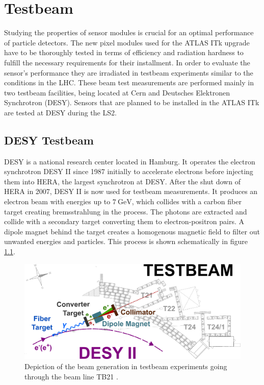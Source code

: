 \chapter{Testbeam}
Studying the properties of sensor modules is crucial for an optimal performance of particle detectors. The new pixel modules used for the ATLAS ITk upgrade have to be thoroughly
tested in terms of efficiency and radiation hardness to fulfill the necessary requirements for their installment.
In order to evaluate the sensor's performance they are irradiated in testbeam experiments similar to the conditions in the LHC.
These beam test measurements are performed mainly in two testbeam facilities, being located at Cern and Deutsches Elektronen Synchrotron (DESY). Sensors that are planned to be
installed in the ATLAS ITk are tested at DESY during the LS2.

\section{DESY Testbeam}
DESY is a national research center located in Hamburg. It operates the electron synchrotron DESY II since 1987 initially to accelerate electrons before injecting them into
HERA, the largest synchrotron at DESY. After the shut down of HERA in 2007, DESY II is now used for testbeam measurements. It produces an electron beam with energies up to
$\SI{7}{\GeV}$, which collides with a carbon fiber target creating bremsstrahlung in the process. The photons are extracted and collide with a secondary target
converting them to electron-positron pairs. A dipole magnet behind the target creates a homogenous magnetic field to filter out unwanted energies and particles. This process
is shown schematically in figure \ref{fig:testbeam}.

\begin{figure}
  \centering
  \includegraphics[height=0.4\textwidth]{images/desy.png}
  \caption{Depiction of the beam generation in testbeam experiments going through the beam line TB21 \cite{testbeam}.}
  \label{fig:testbeam}
\end{figure}

